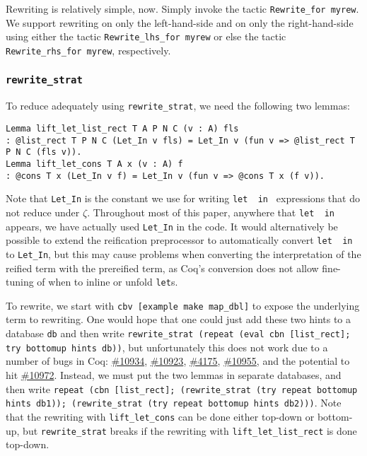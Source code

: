 \documentclass[a4paper,USenglish,cleveref,autoref,thm-restate]{lipics-v2021}
\makeatletter
\newcommand{\coqbug}[1]{\href{https://github.com/coq/coq/issues/#1}{\##1}}
\newcommand{\letin}[1][{\ensuremath{\cdots}}{\ensuremath{\cdots}}]{%
  \texttt{let }\@firstoftwo#1\texttt{ in }\@secondoftwo#1
}
\makeatother
\begin{document}
Rewriting is relatively simple, now.
Simply invoke the tactic \texttt{Rewrite_for myrew}.
We support rewriting on only the left-hand-side and on only the right-hand-side using either the tactic \texttt{Rewrite_lhs_for myrew} or else the tactic \texttt{Rewrite_rhs_for myrew}, respectively.

\subsubsection{\texorpdfstring{\texttt{rewrite\_strat}}{rewrite\_strat}}

To reduce adequately using \texttt{rewrite\_strat}, we need the following two lemmas:
\begin{verbatim}
Lemma lift_let_list_rect T A P N C (v : A) fls
: @list_rect T P N C (Let_In v fls) = Let_In v (fun v => @list_rect T P N C (fls v)).
Lemma lift_let_cons T A x (v : A) f
: @cons T x (Let_In v f) = Let_In v (fun v => @cons T x (f v)).
\end{verbatim}

Note that \texttt{Let_In} is the constant we use for writing \letin{} expressions that do not reduce under $\zeta$.
Throughout most of this paper, anywhere that \letin{} appears, we have actually used \texttt{Let_In} in the code.
It would alternatively be possible to extend the reification preprocessor to automatically convert \letin{} to \texttt{Let_In}, but this may cause problems when converting the interpretation of the reified term with the prereified term, as Coq's conversion does not allow fine-tuning of when to inline or unfold \texttt{let}s.

To rewrite, we start with \texttt{cbv [example make map_dbl]} to expose the underlying term to rewriting.
One would hope that one could just add these two hints to a database \texttt{db} and then write \texttt{rewrite\_strat (repeat (eval cbn [list\_rect]; try bottomup hints db))}, but unfortunately this does not work due to a number of bugs in Coq: \coqbug{10934}, \coqbug{10923}, \coqbug{4175}, \coqbug{10955}, and the potential to hit \coqbug{10972}.
Instead, we must put the two lemmas in separate databases, and then write \texttt{repeat (cbn [list\_rect]; (rewrite\_strat (try repeat bottomup hints db1)); (rewrite\_strat (try repeat bottomup hints db2)))}.
Note that the rewriting with \texttt{lift_let_cons} can be done either top-down or bottom-up, but \texttt{rewrite\_strat} breaks if the rewriting with \texttt{lift_let_list_rect} is done top-down.
\end{document}
